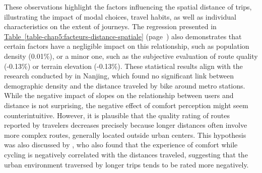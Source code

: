 \begin{refsegment}
These observations highlight the factors influencing the spatial distance of trips, illustrating the impact of modal choices, travel habits, as well as individual characteristics on the extent of journeys. The regression presented in \hyperref[table-chap5:facteurs-distance-spatiale]{Table~\ref{table-chap5:facteurs-distance-spatiale}} (page~\pageref{table-chap5:facteurs-distance-spatiale}) also demonstrates that certain factors have a negligible impact on this relationship, such as population density (0.01\%), or a minor one, such as the subjective evaluation of route quality (-0.13\%) or terrain elevation (-0.13\%). These statistical results align with the research conducted by \textcolor{blue}{\textcite[181]{gan_associations_2021}} in Nanjing, which found no significant link between demographic density and the distance traveled by bike around metro stations. While the negative impact of slopes on the relationship between users and distance is not surprising, the negative effect of comfort perception might seem counterintuitive. However, it is plausible that the quality rating of routes reported by travelers decreases precisely because longer distances often involve more complex routes, generally located outside urban centers. This hypothesis was also discussed by \textcolor{blue}{\textcite[185]{gan_associations_2021}}, who also found that the experience of comfort while cycling is negatively correlated with the distances traveled, suggesting that the urban environment traversed by longer trips tends to be rated more negatively.%


\end{refsegment}
